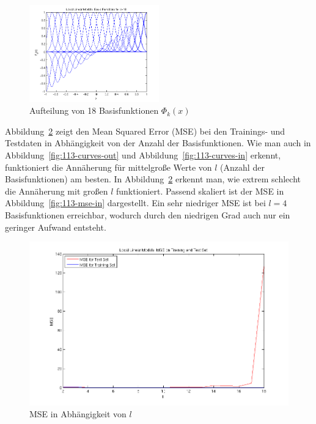 \begin{figure}[h!]
  \centering
  \includegraphics[width=0.5\textwidth]{./figures/1_1_3_basis_18.png}
  \caption{Aufteilung von 18 Basisfunktionen $\Phi_k(x)$}
  \label{fig:113-basis-18}
\end{figure}

Abbildung~\ref{fig:113-mse-out} zeigt den Mean Squared Error (MSE) bei den Trainings- und Testdaten in Abhängigkeit von der Anzahl der Basisfunktionen. Wie man auch in Abbildung~\ref{fig:113-curves-out} und Abbildung~\ref{fig:113-curves-in} erkennt, funktioniert die Annäherung für mittelgroße Werte von $l$ (Anzahl der Basisfunktionen) am besten. In Abbildung~\ref{fig:113-mse-out} erkennt man, wie extrem schlecht die Annäherung mit großen $l$ funktioniert. Passend skaliert ist der MSE in Abbildung~\ref{fig:113-mse-in} dargestellt. Ein sehr niedriger MSE ist bei $l=4$ Basisfunktionen erreichbar, wodurch durch den niedrigen Grad auch nur ein geringer Aufwand entsteht.

\begin{figure}[h!]
  \centering
  \includegraphics[width=\textwidth]{./figures/1_1_3_mse_out.png}
  \caption{MSE in Abhängigkeit von $l$}
  \label{fig:113-mse-out}
\end{figure}

